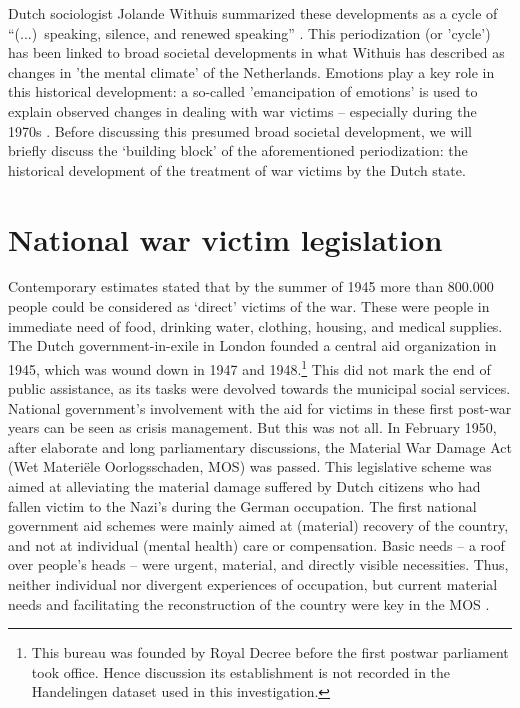 \documentclass{dhbenelux}
\begin{document}
Dutch sociologist Jolande Withuis summarized these developments as a cycle of ``(...)~speaking, silence, and renewed speaking'' \citep{withuis_erkenning._2002, kosaka_victims_2008}. This periodization (or 'cycle') has been linked to broad societal developments in what Withuis has described as changes in 'the mental climate' of the Netherlands. Emotions play a key role in this historical development: a so-called 'emancipation of emotions' is used to explain observed changes in dealing with war victims – especially during the 1970s \citep{withuis_erkenning._2002}. Before discussing this presumed broad societal development, we will briefly discuss the ‘building block’ of the aforementioned periodization: the historical development of the treatment of war victims by the Dutch state. 

\section{National war victim legislation}
Contemporary estimates stated that by the summer of 1945 more than 800.000 people could be considered as ‘direct’ victims of the war. These were people in immediate need of food, drinking water, clothing, housing, and medical supplies. The Dutch government-in-exile in London founded a central aid organization in 1945, which was wound down in 1947 and 1948.\footnote{This bureau was founded by Royal Decree before the first postwar parliament took office. Hence discussion its establishment is not recorded in the Handelingen dataset used in this investigation.} This did not mark the end of public assistance, as its tasks were devolved towards the municipal social services.  National government’s involvement with the aid for victims in these first post-war years can be seen as crisis management. But this was not all. In February 1950, after elaborate and long parliamentary discussions, the Material War Damage Act (Wet Materiële Oorlogsschaden, MOS) was passed. This legislative scheme was aimed at alleviating the material damage suffered by Dutch citizens who had fallen victim to the Nazi's during the German occupation. The first national government aid schemes were mainly aimed at (material) recovery of the country, and not at individual (mental health) care or compensation. Basic needs – a roof over people's heads – were urgent, material, and directly visible necessities. Thus, neither individual nor divergent experiences of occupation, but current material needs and facilitating the reconstruction of the country were key in the MOS \citep{bossenbroek_meelstreep_2001}. 
\end{document}
